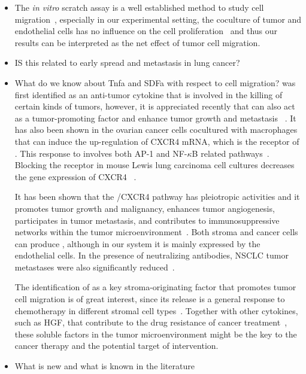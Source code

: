 \begin{itemize}
\item The \emph{in vitro} scratch assay is a well established method
to study cell migration~\cite{Busch2008,Liang2007}, especially
in our experimental setting, the coculture of tumor and 
endothelial cells has no influence on the cell proliferation~%
\cite{Dauscher2012} and thus our results can be interpreted
as the net effect of tumor cell migration.

\item IS this related to early spread and metastasis in lung cancer? 

\item What do we know about Tnfa and SDFa with respect to cell migration?
\tnfa was first identified as an anti-tumor cytokine that is involved in the killing
of certain kinds of tumors, however, it is appreciated recently that \tnfa can also 
act as a tumor-promoting factor and enhance tumor growth and metastasis%
~\cite{Wu2010}. It has also been shown in the ovarian cancer cells cocultured with
macrophages that \tnfa can induce the up-regulation of 
CXCR4 mRNA, which is the receptor of \sdfonea. This response to \tnfa involves both
AP-1 and NF-$\kappa$B related pathways~\cite{Kulbe2005}. Blocking the \tnfa receptor
in mouse Lewis lung carcinoma cell cultures decreases the gene expression of CXCR4~%
\cite{Sasi2011}.

It has been shown that the \sdfonea/CXCR4 pathway has pleiotropic activities and it 
promotes tumor growth and malignancy, enhances tumor angiogenesis, participates in tumor metastasis, and contributes to immunosuppressive networks within the tumor microenvironment~\cite{Kryczek2007}. Both stroma and cancer cells can produce \sdfonea, 
although in our system it is mainly expressed by the endothelial cells. In the presence of neutralizing \sdfonea antibodies, NSCLC tumor metastases were also significantly reduced~\cite{Phillips2003}.

The identification of \tnfa as a key stroma-originating factor that promotes 
tumor cell migration is of great interest, since its release is a general response to chemotherapy in different stromal cell types~\cite{Acharyya2012}. Together with
other cytokines, such as HGF, that contribute to the drug resistance of cancer
treatment~\cite{Straussman2012}, these soluble factors in the tumor microenvironment
might be the key to the cancer therapy and the potential target of intervention.


\item What is new and what is known in the literature


\end{itemize}
